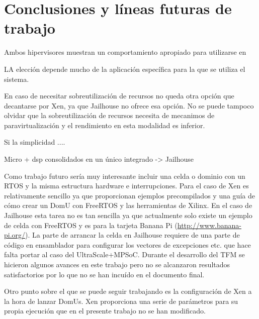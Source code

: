 \chapter{Conclusiones y líneas futuras de trabajo}

Ambos hipervisores muestran un comportamiento apropiado para utilizarse en

LA elección depende mucho de la aplicación específica para la que se utiliza el sistema.

En caso de necesitar sobreutilización de recursos no queda otra opción que decantarse por Xen, ya que Jailhouse no ofrece esa opción. No se puede tampoco olvidar que la sobreutilización de recursos necesita de mecanimos de paravirtualización y el rendimiento en esta modalidad es inferior.

Si la simplicidad ....

Micro + dsp consolidados en un único integrado -> Jailhouse

Como trabajo futuro sería muy interesante incluir una celda o dominio con un \acrshort{RTOS} y la misma estructura hardware e interrupciones. Para el caso de Xen es relativamente sencillo ya que proporcionan ejemplos precompilados y una guía de cómo crear un DomU con FreeRTOS y las herramientas de Xilinx. En el caso de Jailhouse esta tarea no es tan sencilla ya que actualmente solo existe un ejemplo de celda con FreeRTOS y es para la tarjeta Banana Pi (\url{http://www.banana-pi.org/}). La parte de arrancar la celda en Jailhouse requiere de una parte de código en ensamblador para configurar los vectores de excepciones etc. que hace falta portar al caso del UltraScale+\texttrademark MPSoC. Durante el desarrollo del TFM se hicieron algunos avances en este trabajo pero no se alcanzaron resultados satisfactorios por lo que no se han incuído en el documento final.

Otro punto sobre el que se puede seguir trabajando es la configuración de Xen a la hora de lanzar DomUs. Xen proporciona una serie de parámetros para su propia ejecución que en el presente trabajo no se han modificado.
